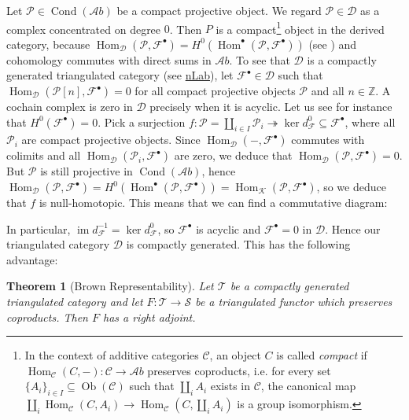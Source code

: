 \documentclass[11pt,A4]{article}
\theoremstyle{plain}
\newtheorem{thm}{Theorem}[section]
\theoremstyle{definition}
\theoremstyle{remark}
\newcommand{\Z}{\mathbb{Z}}
\newcommand{\1}{\mathbbm{1}}
\newcommand{\F}{\mathcal{F}}
\newcommand{\calP}{\mathcal{P}}
\newcommand{\scrC}{\mathscr{C}}
\newcommand{\Ab}{\mathscr{A}b}
\newcommand{\D}{\mathscr{D}}
\newcommand{\K}{\mathscr{K}}
\DeclareMathOperator{\Hom}{Hom}
\DeclareMathOperator{\Cond}{Cond}
\DeclareMathOperator{\Ob}{Ob}
\DeclareMathOperator{\im}{im}
\newcommand{\grd}{^{\bullet}}
\begin{document}
Let $\calP\in \Cond(\Ab)$ be a compact projective object.
We regard $\calP\in \D$ as a complex concentrated on degree $0$.
Then $P$ is a compact\footnote{In the context of additive categories $\scrC$, an object $C$ is called \textit{compact} if $\Hom_{\scrC}(C,-)\colon \scrC\to \Ab$ preserves coproducts, i.e. for every set $\{A_{i}\}_{i\in I}\subseteq \Ob(\scrC)$ such that $\coprod_{i}A_{i}$ exists in $\scrC$, the canonical map $\coprod_{i}\Hom_{\scrC}(C,A_{i})\to \Hom_{\scrC}(C,\coprod_{i}A_{i})$ is a group isomorphism.} object in the derived category, because $\Hom_{\D}(\calP,\F\grd)=H^{0}(\Hom\grd(\calP,\F\grd))$ (see \cite[Proposition 1.4]{spa88}) and cohomology commutes with direct sums in $\Ab$.
To see that $\D$ is a compactly generated triangulated category (see \href{https://ncatlab.org/nlab/show/compactly+generated+triangulated+category}{nLab}), let $\F\grd\in \D$ such that $\Hom_{\D}(\calP[n],\F\grd)=0$ for all compact projective objects $\calP$ and all $n\in \Z$.
A cochain complex is zero in $\D$ precisely when it is acyclic.
Let us see for instance that $H^{0}(\F\grd)=0$.
Pick a surjection $f\colon \calP=\coprod_{i\in I}\calP_{i}\twoheadrightarrow \ker{d_{\F}^{0}}\subseteq \F\grd$, where all $\calP_{i}$ are compact projective objects.
Since $\Hom_{\D}(-,\F\grd)$ commutes with colimits and all $\Hom_{\D}(\calP_{i},\F\grd)$ are zero, we deduce that $\Hom_{\D}(\calP,\F\grd)=0$.
But $\calP$ is still projective in $\Cond(\Ab)$, hence $\Hom_{\D}(\calP,\F\grd)=H^{0}(\Hom\grd(\calP,\F\grd))=\Hom_{\K}(\calP,\F\grd)$, so we deduce that $f$ is null-homotopic.
This means that we can find a commutative diagram:
\begin{center}
\end{center}
In particular, $\im{d_{\F}^{-1}}=\ker{d_{\F}^{0}}$, so $\F\grd$ is acyclic and $\F\grd=0$ in $\D$.
Hence our triangulated category $\D$ is compactly generated.
This has the following advantage:

\begin{thm}[Brown Representability]
    Let $\mathscr{T}$ be a compactly generated triangulated category and let $F\colon \mathscr{T}\to \mathscr{S}$ be a triangulated functor which preserves coproducts.
    Then $F$ has a right adjoint.
\end{thm}



\end{document}
